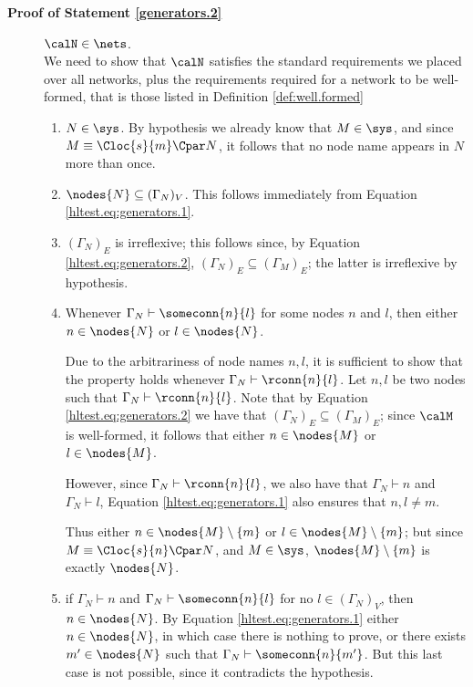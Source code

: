 \documentclass{LMCS}
\begin{document}
\begin{description}
\item[\textbf{Proof of Statement \ref{generators.2}}] $\calN \in \nets$.\\
We need to show that $\calN$ satisfies the standard requirements we placed over 
all networks, plus the requirements required for a network to be well-formed, that is those 
listed in Definition \ref{def:well.formed}
\begin{enumerate}
\item $N \in \sys$. 
By hypothesis we already know 
that $M \in \sys$, and since $M \equiv \Cloc{s}{m} \Cpar N$, it follows that 
no node name appears in $N$ more than once.

\item $\nodes{N} \subseteq (\Gamma_N)_V$. This follows immediately from  
Equation \eqref{hltest.eq:generators.1}.

\item $(\Gamma_N)_E$ is irreflexive; this follows since, by Equation \eqref{hltest.eq:generators.2}, 
$(\Gamma_N)_E \subseteq (\Gamma_M)_E$; the latter is irreflexive by hypothesis.

\item Whenever $\Gamma_N \vdash \someconn{n}{l}$ for some nodes $n$ and $l$, 
then either $n \in \nodes{N}$ or $l \in \nodes{N}$. 

Due to the arbitrariness of node names $n,l$, it is sufficient to show that 
the property holds whenever $\Gamma_N \vdash \rconn{n}{l}$. 
Let $n,l$ be two nodes such that $\Gamma_N \vdash \rconn{n}{l}$. 
Note that by Equation \eqref{hltest.eq:generators.2} we have that $(\Gamma_N)_E 
\subseteq (\Gamma_M)_E$; since $\calM$ is well-formed, it follows 
that either $n \in \nodes{M}$ or $l \in \nodes{M}$.

However, since $\Gamma_N \vdash \rconn{n}{l}$, we also have that $\Gamma_N \vdash n$ and $\Gamma_N \vdash l$, 
Equation \eqref{hltest.eq:generators.1} also ensures that $n,l \neq m$.

Thus either $n \in \nodes{M} \setminus \{m\}$ or $l \in \nodes{M} \setminus \{m\}$; 
but since $M \equiv \Cloc{s}{n} \Cpar N$, and $M \in \sys$,  
$\nodes{M} \setminus \{m\}$ is exactly $\nodes{N}$.

\item if $\Gamma_N \vdash n$ and $\Gamma_N \vdash \someconn{n}{l}$ for no $l \in (\Gamma_N)_V$, 
then $n \in \nodes{N}$. By Equation \ref{hltest.eq:generators.1} either $n \in \nodes{N}$, in 
which case there is nothing to prove, or there exists $m' \in \nodes{N}$ such that $\Gamma_N \vdash \someconn{n}{m'}$. 
But this last case is not possible, since it contradicts the hypothesis.


\end{enumerate}
\end{description}
\end{document}
